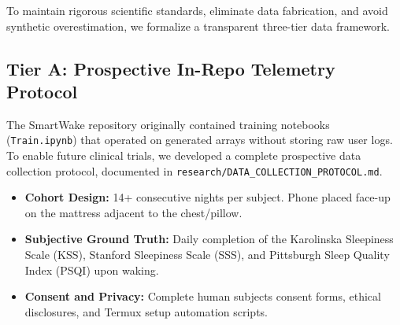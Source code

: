 \documentclass[journal,11pt,onecolumn]{IEEEtran}
\begin{document}
To maintain rigorous scientific standards, eliminate data fabrication, and avoid synthetic overestimation, we formalize a transparent three-tier data framework.

\subsection{Tier A: Prospective In-Repo Telemetry Protocol}
The SmartWake repository originally contained training notebooks (\texttt{Train.ipynb}) that operated on generated arrays without storing raw user logs. To enable future clinical trials, we developed a complete prospective data collection protocol, documented in \texttt{research/}\allowbreak\texttt{DATA\_}\allowbreak\texttt{COLLECTION\_}\allowbreak\texttt{PROTOCOL.md}.
\begin{itemize}[leftmargin=*]
    \item \textbf{Cohort Design:} 14+ consecutive nights per subject. Phone placed face-up on the mattress adjacent to the chest/pillow.
    \item \textbf{Subjective Ground Truth:} Daily completion of the Karolinska Sleepiness Scale (KSS), Stanford Sleepiness Scale (SSS), and Pittsburgh Sleep Quality Index (PSQI) upon waking.
    \item \textbf{Consent and Privacy:} Complete human subjects consent forms, ethical disclosures, and Termux setup automation scripts.
\end{itemize}
\end{document}
